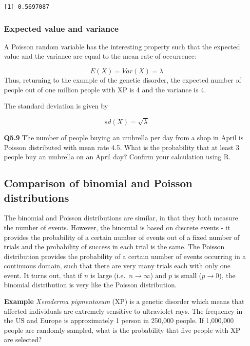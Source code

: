 \documentclass[
  oneside]{krantz}
\begin{document}
\begin{verbatim}
[1] 0.5697087
\end{verbatim}

\hypertarget{expected-value-and-variance}{%
\subsubsection{Expected value and variance}\label{expected-value-and-variance}}

A Poisson random variable has the interesting property such that the expected value and the variance are equal to the mean rate of occurrence:

\[E(X) = Var(X) = \lambda\]
Thus, returning to the example of the genetic disorder, the expected number of people out of one million people with XP is 4 and the variance is 4.

The standard deviation is given by

\[sd(X) = \sqrt{\lambda}\]

\textbf{Q5.9} The number of people buying an umbrella per day from a shop in April is Poisson
distributed with mean rate 4.5. What is the probability that at least 3 people buy an umbrella on an April day? Confirm your calculation using R.

\hypertarget{comparison-of-binomial-and-poisson-distributions}{%
\subsection{Comparison of binomial and Poisson distributions}\label{comparison-of-binomial-and-poisson-distributions}}

The binomial and Poisson distributions are similar, in that they both measure the number of events. However, the binomial is based on discrete events - it provides the probability of a certain number of events out of a fixed number of trials and the probability of success in each trial is the same. The Poisson distribution provides the probability of a certain number of events occurring in a continuous domain, such that there are very many trials each with only one event. It turns out, that if \(n\) is large (i.e.~\(n \rightarrow \infty\)) and \(p\) is small (\(p \rightarrow 0\)), the binomial distribution is very like the Poisson distribution.

\textbf{Example} \textit{Xeroderma pigmentosum} (XP) is a genetic disorder which means that affected individuals are extremely sensitive to ultraviolet rays. The frequency in the US and Europe is approximately 1 person in 250,000 people. If 1,000,000 people are randomly sampled, what is the probability that five people with XP are selected?
\end{document}
